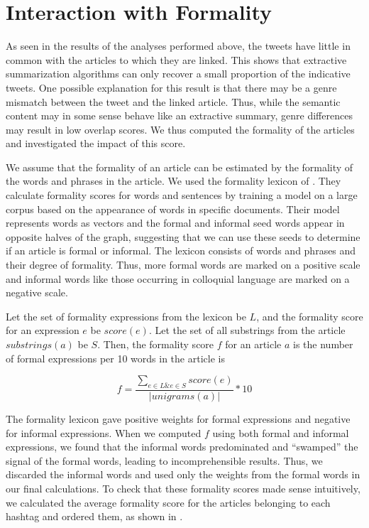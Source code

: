 \section{Interaction with Formality}

As seen in the results of the analyses performed above, the tweets have little in common with the articles to which they are linked. This shows that extractive summarization algorithms can only recover a small proportion of the indicative tweets. One possible explanation for this result is that there may be a genre mismatch between the tweet and the linked article. Thus, while the semantic content may in some sense behave like an extractive summary, genre differences may result in low overlap scores. We thus computed the formality of the articles and investigated the impact of this score.

We assume that the formality of an article can be estimated by the formality of the words and phrases in the article. We used the formality lexicon of \cite{brooke2013multi}. They calculate formality scores for words and sentences by training a model on a large corpus based on the appearance of words in specific documents. Their model represents words as vectors and the formal and informal seed words appear in opposite halves of the graph, suggesting that we can use these seeds to determine if an article is formal or informal. The lexicon consists of words and phrases and their degree of formality. Thus, more formal words are marked on a positive scale and informal words like those occurring in colloquial language are marked on a negative scale. 

Let the set of formality expressions from the lexicon be $L$, and the formality score for an expression $e$ be $\textit{score}(e)$. Let the set of all substrings from the article $\textit{substrings}(a)$ be $S$. Then, the formality score $f$ for an article $a$ is the number of formal expressions per 10 words in the article is   

\begin{equation}
f = \frac{\sum\limits_{e \in L \& e \in S} \textit{score}(e)}{| \textit{unigrams}(a) |} * 10
\end{equation}

The formality lexicon gave positive weights for formal expressions and negative for informal expressions. When we computed $f$ using both formal and informal expressions, we found that the informal words predominated and ``swamped'' the signal of the formal words, leading to incomprehensible results. Thus, we discarded the informal words and used only the weights from the formal words in our final calculations. To check that these formality scores made sense intuitively, we calculated the average formality score for the articles belonging to each hashtag and ordered them, as shown in .

